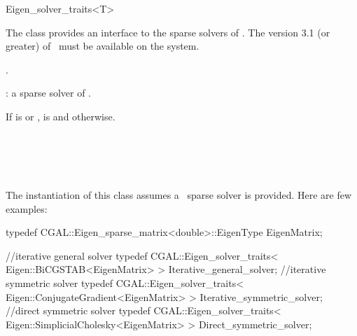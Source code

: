 \ccRefPageBegin
\begin{ccRefClass}{Eigen_solver_traits<T>}

\ccDefinition

The class  provides an interface to the sparse solvers of \eigen. 
The version 3.1 (or greater) of \eigen\ must be available on the system.


\ccIsModel
{}.

\ccParameters
{}: a sparse solver of \eigen.

\ccTypes
{}
{If  is  or ,  is 
and  otherwise.
}

\ccSeeAlso
\eigenpage\\
  \\
  \\
  \\

\ccExample
The instantiation of this class assumes a \eigen\ sparse solver is provided. Here are few examples:

\begin{ccExampleCode}
typedef CGAL::Eigen_sparse_matrix<double>::EigenType EigenMatrix;

//iterative general solver
typedef CGAL::Eigen_solver_traits< Eigen::BiCGSTAB<EigenMatrix> > Iterative_general_solver;
//iterative symmetric solver
typedef CGAL::Eigen_solver_traits< Eigen::ConjugateGradient<EigenMatrix> > Iterative_symmetric_solver;
//direct symmetric solver
typedef CGAL::Eigen_solver_traits< Eigen::SimplicialCholesky<EigenMatrix> > Direct_symmetric_solver;
\end{ccExampleCode}


\end{ccRefClass}

\ccRefPageEnd


